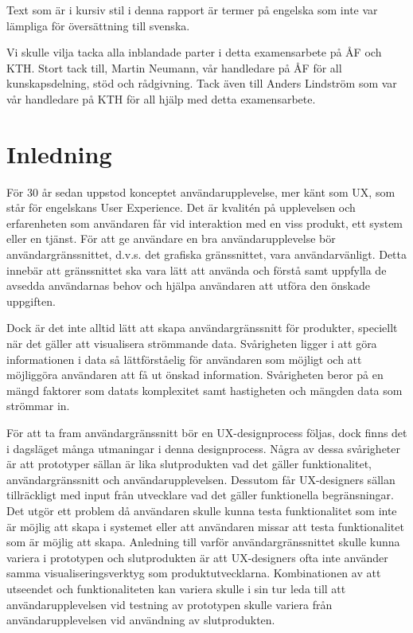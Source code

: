 \documentclass[12pt]{kththesis}
\begin{document}
Text som är i kursiv stil i denna rapport är termer på engelska som inte var lämpliga för översättning till svenska.

Vi skulle vilja tacka alla inblandade parter i detta examensarbete på ÅF och KTH. Stort tack till, Martin Neumann, vår handledare på ÅF för all kunskapsdelning, stöd och rådgivning. Tack även till Anders Lindström som var vår handledare på KTH för all hjälp med detta examensarbete. 

\afterpage{\null\newpage}

\tableofcontents


\mainmatter

\afterpage{\null\newpage}


\chapter{Inledning}

För 30 år sedan uppstod konceptet användarupplevelse, mer känt som UX, som står för engelskans User Experience. Det är kvalitén på upplevelsen och erfarenheten som användaren får vid interaktion med en viss produkt, ett system eller en tjänst. För att ge användare en bra användarupplevelse bör användargränssnittet, d.v.s. det grafiska gränssnittet, vara användarvänligt. Detta innebär att gränssnittet ska vara lätt att använda och förstå samt uppfylla de avsedda användarnas behov och hjälpa användaren att utföra den önskade uppgiften. 

Dock är det inte alltid lätt att skapa användargränssnitt för produkter, speciellt när det gäller att visualisera strömmande data. Svårigheten ligger i att göra informationen i data så lättförståelig för användaren som möjligt och att möjliggöra användaren att få ut önskad information. Svårigheten beror på en mängd faktorer som datats komplexitet samt hastigheten och mängden data som strömmar in.

För att ta fram användargränssnitt bör en UX-designprocess följas, dock finns det i dagsläget många utmaningar i denna designprocess. Några av dessa svårigheter är att prototyper sällan är lika slutprodukten vad det gäller funktionalitet, användargränssnitt och användarupplevelsen. Dessutom får UX-designers sällan tillräckligt med input från utvecklare vad det gäller funktionella begränsningar. Det utgör ett problem då användaren skulle kunna testa funktionalitet som inte är möjlig att skapa i systemet eller att användaren missar att testa funktionalitet som är möjlig att skapa. Anledning till varför användargränssnittet skulle kunna variera i prototypen och slutprodukten är att UX-designers ofta inte använder samma visualiseringsverktyg som produktutvecklarna. Kombinationen av att utseendet och funktionaliteten kan variera skulle i sin tur leda till att användarupplevelsen vid testning av prototypen skulle variera från användarupplevelsen vid användning av slutprodukten. 
\end{document}
